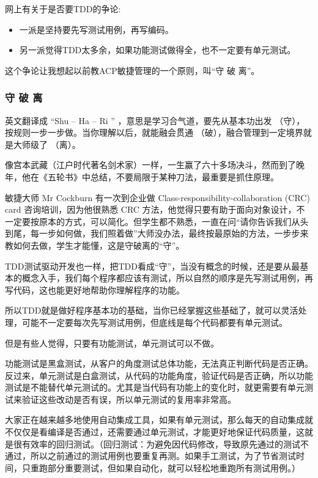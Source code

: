 网上有关于是否要TDD的争论:

\begin{itemize}
\tightlist
\item
  一派是坚持要先写测试用例，再写编码。
\item
  另一派觉得TDD太多余，如果功能测试做得全，也不一定要有单元测试。
\end{itemize}

这个争论让我想起以前教ACP敏捷管理的一个原则，叫``守 破 离''。

\hypertarget{ux5b88-ux7834-ux79bb}{%
\subsubsection{守 破 离}\label{ux5b88-ux7834-ux79bb}}

英文翻译成 ``Shu -- Ha -- Ri '' ，意思是学习合气道，要先从基本功出发
（守），按规则一步一步做。当你理解以后，就能融会贯通
（破），融合管理到一定境界就是大师级了 （离）。

像宫本武藏（江户时代著名剑术家）一样，一生赢了六十多场决斗，然而到了晚年，他在《五轮书》中总结，不要局限于某种刀法，最重要是抓住原理。

敏捷大师 Mr Cockburn 有一次到企业做 Class-responsibility-collaboration
(CRC) card 咨询培训，因为他很熟悉 CRC
方法，他觉得只要有助于面向对象设计，不一定要按原本的方式，可以简化。但学生都不熟悉，一直在问``请你告诉我们从头到尾，每一步如何做，我们照着做''大师没办法，最终按最原始的方法，一步步来教如何去做，学生才能懂，这是守破离的``守''。

TDD测试驱动开发也一样，把TDD看成``守''，当没有概念的时候，还是要从最基本的概念入手，我们每个程序都应该有测试，所以自然的顺序是先写测试用例，再写代码，这也能更好地帮助你理解程序的功能。

所以TDD就是做好程序基本功的基础，当你已经掌握这些基础了，就可以灵活处理，可能不一定要每次先写测试用例，但底线是每个代码都要有单元测试。

但是有些人觉得，只要有功能测试，单元测试可以不做。

功能测试是黑盒测试，从客户的角度测试总体功能，无法真正判断代码是否正确。反过来，单元测试是白盒测试，从代码的功能角度，验证代码是否正确，所以功能测试是不能替代单元测试的。尤其是当代码有功能上的变化时，就更需要有单元测试来验证这些改动是否有误，所以单元测试的复用率非常高。

大家正在越来越多地使用自动集成工具，如果有单元测试，那么每天的自动集成就不仅仅是看编译是否通过，还需要通过单元测试，才能更好地保证代码质量，这就是很有效率的回归测试。（回归测试：为避免因代码修改，导致原先通过的测试不通过，所以之前通过的测试用例也要重复再测。如果手工测试，为了节省测试时间，只重跑部分重要测试，但如果自动化，就可以轻松地重跑所有测试用例。）

